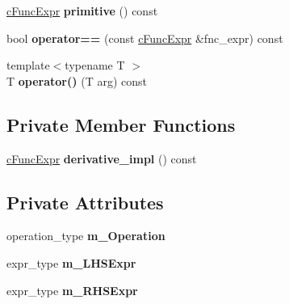 \begin{DoxyCompactItemize}
\item 
\hypertarget{classcFuncExpr_a0cc206609ae5661f8975c3b71a50c530}{\hyperlink{classcFuncExpr}{c\-Func\-Expr} {\bfseries primitive} () const }\label{classcFuncExpr_a0cc206609ae5661f8975c3b71a50c530}

\item 
\hypertarget{classcFuncExpr_a45aa9930e7835d9a5fa2ba11a2699db9}{bool {\bfseries operator==} (const \hyperlink{classcFuncExpr}{c\-Func\-Expr} \&fnc\-\_\-expr) const }\label{classcFuncExpr_a45aa9930e7835d9a5fa2ba11a2699db9}

\item 
\hypertarget{classcFuncExpr_a1405ab25515b13bd9b16763f80b5ef66}{{\footnotesize template$<$typename T $>$ }\\T {\bfseries operator()} (T arg) const }\label{classcFuncExpr_a1405ab25515b13bd9b16763f80b5ef66}

\end{DoxyCompactItemize}
\subsection*{Private Member Functions}
\begin{DoxyCompactItemize}
\item 
\hypertarget{classcFuncExpr_a3f0fb6e88e7794b9c048562da7ddaddc}{\hyperlink{classcFuncExpr}{c\-Func\-Expr} {\bfseries derivative\-\_\-impl} () const }\label{classcFuncExpr_a3f0fb6e88e7794b9c048562da7ddaddc}

\end{DoxyCompactItemize}
\subsection*{Private Attributes}
\begin{DoxyCompactItemize}
\item 
\hypertarget{classcFuncExpr_a198c337af0292c7fafef007801cfee3a}{operation\-\_\-type {\bfseries m\-\_\-\-Operation}}\label{classcFuncExpr_a198c337af0292c7fafef007801cfee3a}

\item 
\hypertarget{classcFuncExpr_a678206897a682b72a34a6e1176e47592}{expr\-\_\-type {\bfseries m\-\_\-\-L\-H\-S\-Expr}}\label{classcFuncExpr_a678206897a682b72a34a6e1176e47592}

\item 
\hypertarget{classcFuncExpr_ae4acff93f9a21a7b5c472b9a0202acd5}{expr\-\_\-type {\bfseries m\-\_\-\-R\-H\-S\-Expr}}\label{classcFuncExpr_ae4acff93f9a21a7b5c472b9a0202acd5}

\end{DoxyCompactItemize}

